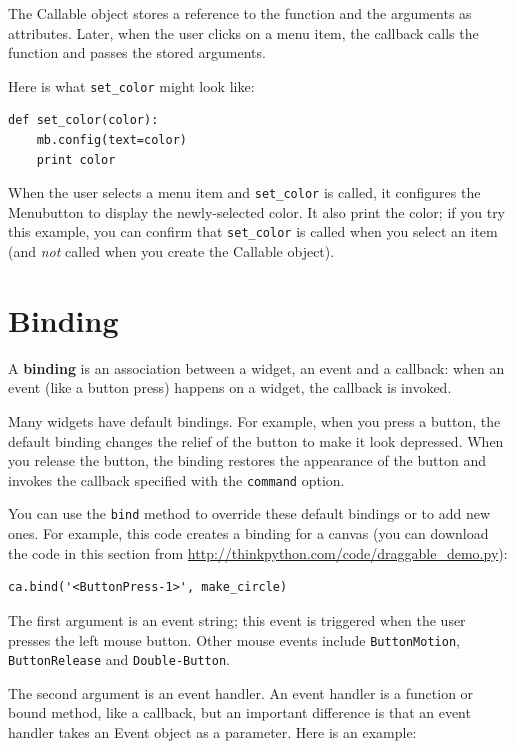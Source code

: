 \documentclass[10pt]{book}
\begin{document}
The Callable object stores a reference to the function and the
arguments as attributes.  Later, when the user clicks on a menu
item, the callback calls the function and passes the stored
arguments.

Here is what \verb"set_color" might look like:

\begin{verbatim}
def set_color(color):
    mb.config(text=color)
    print color
\end{verbatim}
%
When the user selects a menu item and \verb"set_color" is called,
it configures the Menubutton to display the newly-selected color.
It also print the color; if you try this example, you can confirm that
\verb"set_color" is called when you select an item (and {\em not}
called when you create the Callable object).


\section{Binding}

A {\bf binding} is an association between a widget, an event and a
callback: when an event (like a button press) happens on a widget, the
callback is invoked.

Many widgets have default bindings.  For example, when you press
a button, the default binding changes the relief of the button
to make it look depressed.  When you release the button, the
binding restores the appearance of the button and invokes the
callback specified with the {\tt command} option.

You can use the {\tt bind} method to override these default
bindings or to add new ones.  For example, this code creates a
binding for a canvas (you can download the code in this
section from \url{http://thinkpython.com/code/draggable_demo.py}):

\begin{verbatim}
ca.bind('<ButtonPress-1>', make_circle)
\end{verbatim}
%
The first argument is an event string; this event is triggered
when the user presses the left mouse button.  Other mouse
events include {\tt ButtonMotion}, {\tt ButtonRelease} and
{\tt Double-Button}.

The second argument is an event handler.  An event handler
is a function or bound method, like a callback, but an important
difference is that an event handler takes an Event object as a
parameter.  Here is an example:
\end{document}
